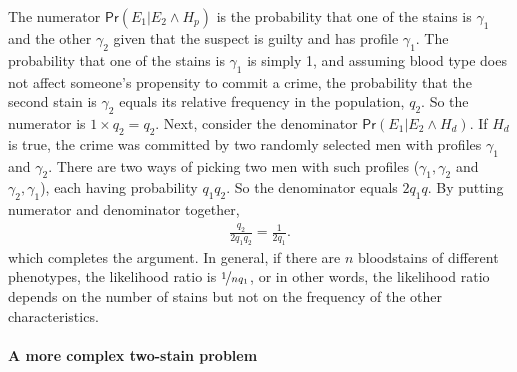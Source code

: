 \documentclass{article}
\newcommand{\pr}{\mathsf{Pr}}
\begin{document}
 \noindent
 The numerator $\pr(E_1 \vert E_2 \wedge H_p)$ is the probability that one of the stains is $\gamma_1$ and the other $\gamma_2$ given that the suspect is guilty and has profile $\gamma_1$.  The probability that one of the stains is $\gamma_1$  is simply 1, and assuming  blood type does not affect someone's propensity to commit a crime, the probability that the second stain is $\gamma_2$ equals its relative frequency in the population, $q_2$. So the numerator is $1\times q_2 = q_2$. 
Next, consider the denominator $\pr(E_1 \vert E_2 \wedge H_d)$.  If $H_d$ is true, 
the crime was committed by two randomly selected men with profiles $\gamma_1$ and $\gamma_2$. %
There are two ways of picking two men with such profiles ($\gamma_1,\gamma_2$ and $\gamma_2,\gamma_1$), each having  probability $q_1q_2$. So the denominator equals $2q_1q$. By putting numerator and denominator together, 
%
 \begin{align*}
 \frac{q_2}{2q_1q_2} = \frac{1}{2q_1}. 
 \end{align*}
 \noindent which completes the argument. In general, if there are $n$ bloodstains of different phenotypes, the likelihood ratio is $\nicefrac{1}{nq_1}$, or in other words, the likelihood ratio depends on the number of stains but not on the frequency of the other characteristics. 

\paragraph{A more complex two-stain problem}
\end{document}
